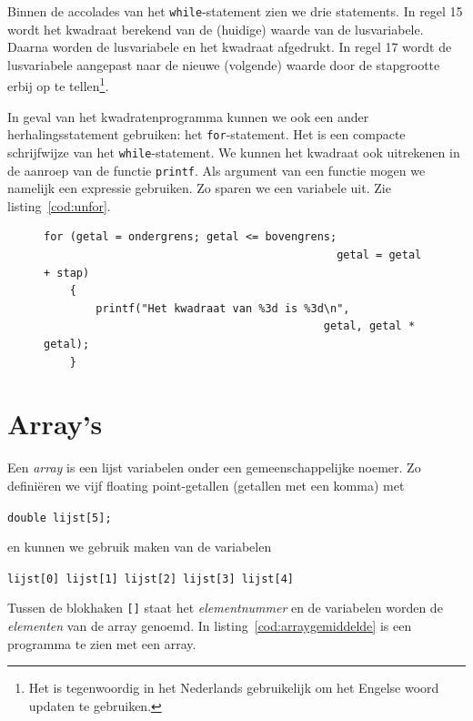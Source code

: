 Binnen de accolades van het \texttt{while}-statement zien we drie statements. In regel 15 wordt het kwadraat berekend van de (huidige) waarde van de lusvariabele. Daarna worden de lusvariabele en het kwadraat afgedrukt. In regel 17 wordt de lusvariabele aangepast naar de nieuwe (volgende) waarde door de stapgrootte erbij op te tellen\footnote{Het is tegenwoordig in het Nederlands gebruikelijk om het Engelse woord updaten te gebruiken.}.

In geval van het kwadratenprogramma kunnen we ook een ander herhalingsstatement gebruiken: het \texttt{for}-statement. Het is een compacte schrijfwijze van het \texttt{while}-statement. We kunnen het kwadraat ook uitrekenen in de aanroep van de functie \texttt{printf}. Als argument van een functie mogen we namelijk een expressie gebruiken. Zo sparen we een variabele uit. Zie listing~\ref{cod:unfor}.

\begin{figure}[!ht]
\begin{lstlisting}[caption=Gebruik van een \texttt{for}-statement.,label=cod:unfor]
	for (getal = ondergrens; getal <= bovengrens;
                                             getal = getal + stap)
	{
		printf("Het kwadraat van %3d is %3d\n",
                                           getal, getal * getal);
	}
\end{lstlisting}
\end{figure}


\section{Array's}
Een \textsl{array} is een lijst variabelen onder een gemeenschappelijke noemer. Zo definiëren we vijf floating point-getallen (getallen met een komma) met

\hspace*{1em}\texttt{double lijst[5];}

en kunnen we gebruik maken van de variabelen

\hspace*{1em}\texttt{lijst[0] lijst[1] lijst[2] lijst[3] lijst[4]}

Tussen de blokhaken \texttt{[]}\indexop{[]} staat het \textsl{elementnummer} en de variabelen worden de \textsl{elementen} van de array genoemd. In listing~\ref{cod:arraygemiddelde} is een programma te zien met een array.


